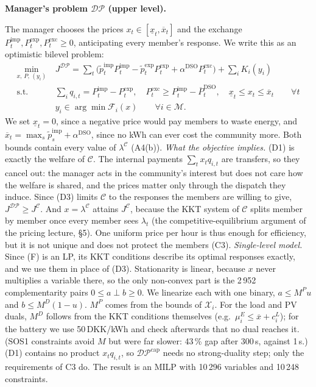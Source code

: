 \documentclass[10pt,a4paper]{article}
\newcommand{\cC}{\mathcal{C}}
\newcommand{\cDP}{\mathcal{DP}}
\newcommand{\cM}{\mathcal{M}}
\newcommand{\pti}{\tilde p^{\mathrm{imp}}_t}
\newcommand{\pte}{\tilde p^{\mathrm{exp}}_t}
\newcommand{\Pimp}{P^{\mathrm{imp}}_t}
\newcommand{\Pexp}{P^{\mathrm{exp}}_t}
\newcommand{\Pexc}{P^{\mathrm{exc}}_t}
\newcommand{\Pcap}{\overline P^{\mathrm{DSO}}_t}
\newcommand{\aD}{\alpha^{\mathrm{DSO}}}
\newcommand{\qitem}[2]{\par\smallskip\noindent{\color{dtured}\textbf{#1}}\enspace\textbf{#2}\par\nopagebreak}
\begin{document}
\qitem{C2}{Manager's problem $\cDP$ (upper level).}
\begin{answer}
The manager chooses the prices $x_t\in[\underline x_t,\overline x_t]$ and the exchange $\Pimp,\Pexp,\Pexc\ge0$, anticipating every member's response. We write this as an optimistic bilevel problem:
\begin{subequations}
\begin{align}
\min_{x,\,P,\,(y_i)}\ & J^{\cDP}=\textstyle\sum_t\big(\pti\Pimp-\pte\Pexp+\aD\Pexc\big)+\sum_iK_i(y_i) \tag{D1}\\
\text{s.t. }& \textstyle\sum_iq_{i,t}=\Pimp-\Pexp,\quad \Pexc\ge\Pimp-\Pcap,\quad \underline x_t\le x_t\le\overline x_t\qquad\forall t \tag{D2}\\
& y_i\in\arg\min\mathcal F_i(x)\qquad\forall i\in\cM. \tag{D3}
\end{align}
\end{subequations}
We set $\underline x_t=0$, since a negative price would pay members to waste energy, and $\overline x_t=\max_s\tilde p^{\mathrm{imp}}_s+\aD$, since no kWh can ever cost the community more. Both bounds contain every value of $\lambda^{\cC}$ (A4(b)).
\emph{What the objective implies.} (D1) is exactly the welfare of $\cC$. The internal payments $\sum_tx_tq_{i,t}$ are transfers, so they cancel out: the manager acts in the community's interest but does not care how the welfare is shared, and the prices matter only through the dispatch they induce. Since (D3) limits $\cC$ to the responses the members are willing to give, $J^{\cDP}\ge J^{\cC}$. And $x=\lambda^{\cC}$ attains $J^{\cC}$, because the KKT system of $\cC$ splits member by member once every member sees $\lambda_t$ (the competitive-equilibrium argument of the pricing lecture, §5). One uniform price per hour is thus enough for efficiency, but it is not unique and does not protect the members (C3).
\emph{Single-level model.} Since (F) is an LP, its KKT conditions describe its optimal responses exactly, and we use them in place of (D3). Stationarity is linear, because $x$ never multiplies a variable there, so the only non-convex part is the 2\,952 complementarity pairs $0\le a\perp b\ge0$. We linearize each with one binary, $a\le M^Pu$ and $b\le M^D(1-u)$. $M^P$ comes from the bounds of $\mathcal X_i$. For the load and PV duals, $M^D$ follows from the KKT conditions themselves (e.g.\ $\mu^E_i\le\overline x+c^L_i$); for the battery we use 50\,DKK/kWh and check afterwards that no dual reaches it. (SOS1 constraints avoid $M$ but were far slower: 43\,\% gap after 300\,s, against 1\,s.) (D1) contains no product $x_tq_{i,t}$, so $\cDP^{\mathrm{cap}}$ needs no strong-duality step; only the requirements of C3 do. The result is an MILP with 10\,296 variables and 10\,248 constraints.

\end{answer}
\end{document}
